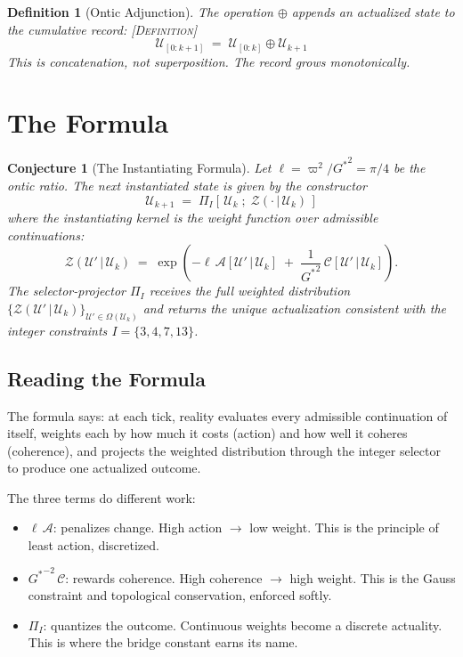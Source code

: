 \documentclass[11pt,a4paper]{article}
\newcommand{\vpi}{\varpi}
\newcommand{\UU}{\mathcal{U}}
\newcommand{\OO}{\Omega}
\newcommand{\PP}{\Pi}
\newcommand{\onticell}{\ell}
\newcommand{\etag}[1]{{\normalfont\textsc{\footnotesize [#1]}}}
\theoremstyle{compact}
\newtheorem{definition}{Definition}
\newtheorem{conjecture}{Conjecture}
\begin{document}
\begin{definition}[Ontic Adjunction]
\label{def:adjunction}
The operation $\oplus$ appends an actualized state to the cumulative record: \etag{Definition}
\[
\UU_{[0:k+1]} \;=\; \UU_{[0:k]} \oplus \UU_{k+1}
\]
This is concatenation, not superposition. The record grows monotonically.
\end{definition}


\section{The Formula}
\label{sec:formula}

\begin{conjecture}[The Instantiating Formula]
\label{conj:formula}
Let $\onticell = \vpi^2/{G^*}^2 = \pi/4$ be the ontic ratio. The next instantiated state is given by the constructor
\begin{equation}
\label{eq:constructor}
\boxed{
\UU_{k+1} \;=\; \PP_I\!\left[\,\UU_k \;;\; \mathcal{Z}(\cdot\,|\,\UU_k)\,\right]
}
\end{equation}
where the \emph{instantiating kernel} is the weight function over admissible continuations:
\begin{equation}
\label{eq:kernel}
\mathcal{Z}(\UU'\,|\,\UU_k) \;=\; \exp\!\left(-\onticell\,\mathcal{A}[\UU'\,|\,\UU_k] \;+\; \frac{1}{{G^*}^2}\,\mathcal{C}[\UU'\,|\,\UU_k]\right).
\end{equation}
The selector-projector $\PP_I$ receives the full weighted distribution $\{\mathcal{Z}(\UU'\,|\,\UU_k)\}_{\UU' \in \OO(\UU_k)}$ and returns the unique actualization consistent with the integer constraints $I = \{3, 4, 7, 13\}$.
\end{conjecture}

\subsection*{Reading the Formula}

The formula says: at each tick, reality evaluates every admissible continuation of itself, weights each by how much it costs (action) and how well it coheres (coherence), and projects the weighted distribution through the integer selector to produce one actualized outcome.

The three terms do different work:
\begin{itemize}[nosep]
\item $\onticell\,\mathcal{A}$: penalizes change. High action $\to$ low weight. This is the principle of least action, discretized.
\item ${G^*}^{-2}\,\mathcal{C}$: rewards coherence. High coherence $\to$ high weight. This is the Gauss constraint and topological conservation, enforced softly.
\item $\PP_I$: quantizes the outcome. Continuous weights become a discrete actuality. This is where the bridge constant earns its name.
\end{itemize}
\end{document}
